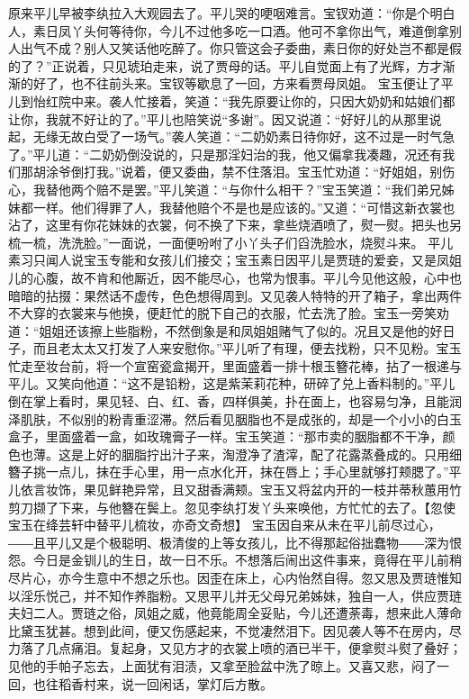 \documentclass[12pt,oneside]{book}
\begin{document}
原来平儿早被李纨拉入大观园去了。平儿哭的哽咽难言。宝钗劝道：“你是个明白人，素日凤丫头何等待你，今儿不过他多吃一口酒。他可不拿你出气，难道倒拿别人出气不成？别人又笑话他吃醉了。你只管这会子委曲，素日你的好处岂不都是假的了？”正说着，只见琥珀走来，说了贾母的话。平儿自觉面上有了光辉，方才渐渐的好了，也不往前头来。宝钗等歇息了一回，方来看贾母凤姐。
宝玉便让了平儿到怡红院中来。袭人忙接着，笑道：“我先原要让你的，只因大奶奶和姑娘们都让你，我就不好让的了。”平儿也陪笑说“多谢”。因又说道：“好好儿的从那里说起，无缘无故白受了一场气。”袭人笑道：“二奶奶素日待你好，这不过是一时气急了。”平儿道：“二奶奶倒没说的，只是那淫妇治的我，他又偏拿我凑趣，况还有我们那胡涂爷倒打我。”说着，便又委曲，禁不住落泪。宝玉忙劝道：“好姐姐，别伤心，我替他两个赔不是罢。”平儿笑道：“与你什么相干？”宝玉笑道：“我们弟兄姊妹都一样。他们得罪了人，我替他赔个不是也是应该的。”又道：“可惜这新衣裳也沾了，这里有你花妹妹的衣裳，何不换了下来，拿些烧酒喷了，熨一熨。把头也另梳一梳，洗洗脸。”一面说，一面便吩咐了小丫头子们舀洗脸水，烧熨斗来。
平儿素习只闻人说宝玉专能和女孩儿们接交；宝玉素日因平儿是贾琏的爱妾，又是凤姐儿的心腹，故不肯和他厮近，因不能尽心，也常为恨事。平儿今见他这般，心中也暗暗的拈掇：果然话不虚传，色色想得周到。又见袭人特特的开了箱子，拿出两件不大穿的衣裳来与他换，便赶忙的脱下自己的衣服，忙去洗了脸。宝玉一旁笑劝道：“姐姐还该擦上些脂粉，不然倒象是和凤姐姐赌气了似的。况且又是他的好日子，而且老太太又打发了人来安慰你。”平儿听了有理，便去找粉，只不见粉。宝玉忙走至妆台前，将一个宣窑瓷盒揭开，里面盛着一排十根玉簪花棒，拈了一根递与平儿。又笑向他道：“这不是铅粉，这是紫茉莉花种，研碎了兑上香料制的。”平儿倒在掌上看时，果见轻、白、红、香，四样俱美，扑在面上，也容易匀净，且能润泽肌肤，不似别的粉青重涩滞。然后看见胭脂也不是成张的，却是一个小小的白玉盒子，里面盛着一盒，如玫瑰膏子一样。宝玉笑道：“那市卖的胭脂都不干净，颜色也薄。这是上好的胭脂拧出汁子来，淘澄净了渣滓，配了花露蒸叠成的。只用细簪子挑一点儿，抹在手心里，用一点水化开，抹在唇上；手心里就够打颊腮了。”平儿依言妆饰，果见鲜艳异常，且又甜香满颊。宝玉又将盆内开的一枝并蒂秋蕙用竹剪刀撷了下来，与他簪在鬓上。忽见李纨打发丫头来唤他，方忙忙的去了。【忽使宝玉在绛芸轩中替平儿梳妆，亦奇文奇想】
宝玉因自来从未在平儿前尽过心，――且平儿又是个极聪明、极清俊的上等女孩儿，比不得那起俗拙蠢物――深为恨怨。今日是金钏儿的生日，故一日不乐。不想落后闹出这件事来，竟得在平儿前稍尽片心，亦今生意中不想之乐也。因歪在床上，心内怡然自得。忽又思及贾琏惟知以淫乐悦己，并不知作养脂粉。又思平儿并无父母兄弟姊妹，独自一人，供应贾琏夫妇二人。贾琏之俗，凤姐之威，他竟能周全妥贴，今儿还遭荼毒，想来此人薄命比黛玉犹甚。想到此间，便又伤感起来，不觉凄然泪下。因见袭人等不在房内，尽力落了几点痛泪。复起身，又见方才的衣裳上喷的酒已半干，便拿熨斗熨了叠好；见他的手帕子忘去，上面犹有泪渍，又拿至脸盆中洗了晾上。又喜又悲，闷了一回，也往稻香村来，说一回闲话，掌灯后方散。
\end{document}
